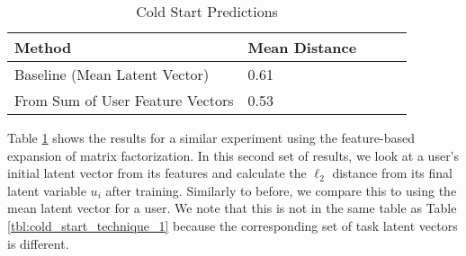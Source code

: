 \begin{table}[t]
\centering
\caption{Cold Start Predictions}
\label{tbl:LightFM}
\begin{tabular}{lllll}
                         \multicolumn{1}{l|}{Method}& Mean Distance \\ \hline
\multicolumn{1}{l|}{Baseline (Mean Latent Vector)} & 0.61 \\
\multicolumn{1}{l|}{From Sum of User Feature Vectors} & 0.53 \\

\end{tabular}
\end{table}

Table \ref{tbl:LightFM} shows the results for a similar experiment using the feature-based expansion of matrix factorization. In this second set of results, we look at a user's initial latent vector from its features and calculate the $\ell_{2}$ distance from its final latent variable $u_{i}$ after training. Similarly to before, we compare this to using the mean latent vector for a user. We note that this is not in the same table as Table \ref{tbl:cold_start_technique_1} because the corresponding set of task latent vectors is different. 
